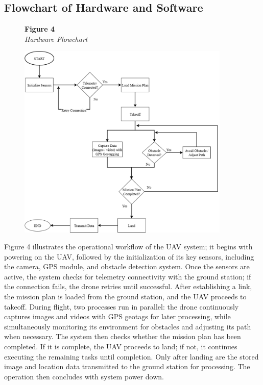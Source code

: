 	\subsection{Flowchart of Hardware and Software}
	
	\begin{figure}[H]
		\raggedright
		\textbf{Figure 4} \\ %
		\textit{Hardware Flowchart} %
		
		\vspace{0.5em}
		\centering
		\includegraphics[width=0.9\textwidth]{figures/Hard_Flow.pdf} %
		
		\vspace{0.5em}
		\raggedright
		
		\label{fig:HardFlow}
	\end{figure}
	
	Figure 4 illustrates the operational workflow of the UAV system; it begins with powering on the UAV, followed by the initialization of its key sensors, including the camera, GPS module, and obstacle detection system. Once the sensors are active, the system checks for telemetry connectivity with the ground station; if the connection fails, the drone retries until successful. After establishing a link, the mission plan is loaded from the ground station, and the UAV proceeds to takeoff. During flight, two processes run in parallel: the drone continuously captures images and videos with GPS geotags for later processing, while simultaneously monitoring its environment for obstacles and adjusting its path when necessary. The system then checks whether the mission plan has been completed. If it is complete, the UAV proceeds to land; if not, it continues executing the remaining tasks until completion. Only after landing are the stored image and location data transmitted to the ground station for processing. The operation then concludes with system power down.
	
